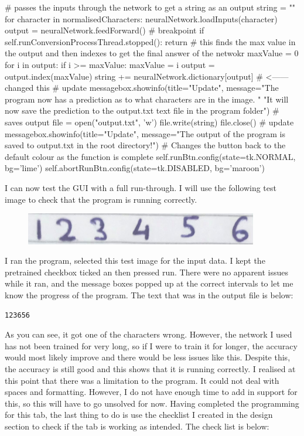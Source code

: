 \documentclass{report}
\begin{document}
\begin{python}
    # passes the inputs through the network to get a string as an output
    string = ""
    for character in normalisedCharacters:
        neuralNetwork.loadInputs(character)
        output = neuralNetwork.feedForward()
        # breakpoint
        if self.runConversionProcessThread.stopped():
            return
        # this finds the max value in the output and then indexes to get the final answer of the netwokr
        maxValue = 0
        for i in output:
            if i >= maxValue:
                maxValue = i
        output = output.index(maxValue)
        string += neuralNetwork.dictionary[output]  # <------ changed this
    # update
    messagebox.showinfo(title="Update",
        message="The program now has a prediction as to what characters are in the image. "
        "It will now save the prediction to the output.txt text file in the program folder")
    # saves output
    file = open("output.txt", 'w')
    file.write(string)
    file.close()
    # update
    messagebox.showinfo(title="Update",
        message="The output of the program is saved to output.txt in the root directory!")
    # Changes the button back to the default colour as the function is complete
    self.runBtn.config(state=tk.NORMAL, bg='lime')
    self.abortRunBtn.config(state=tk.DISABLED, bg='maroon')
\end{python}
I can now test the GUI with a full run-through. I will use the following test image to check that the program is running correctly.
\begin{figure}[H]
    \centering
    \includegraphics[width = 4in]{Images/Development and Testing/Stage 7/Image to Text Conversion Tab/Test Image.jpg}
\end{figure}
\noindent I ran the program, selected this test image for the input data. I kept the pretrained checkbox ticked an then pressed run. There were no apparent issues while it ran, and the message boxes popped up at the correct intervals to let me know the progress of the program. The text that was in the output file is below:
\begin{verbatim}
123656
\end{verbatim}
As you can see, it got one of the characters wrong. However, the network I used has not been trained for very long, so if I were to train it for longer, the accuracy would most likely improve and there would be less issues like this. Despite this, the accuracy is still good and this shows that it is running correctly.
\newline
I realised at this point that there was a limitation to the program. It could not deal with spaces and formatting. However, I do not have enough time to add in support for this, so this will have to go unsolved for now.
\newline
Having completed the programming for this tab, the last thing to do is use the checklist I created in the design section to check if the tab is working as intended. The check list is below:
\end{document}

